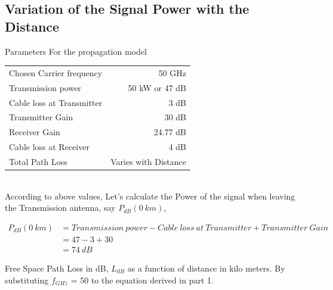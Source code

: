 \documentclass[a4paper,11pt]{article}%
\begin{document}
%
%

\pagebreak
\subsection{Variation of the Signal Power with the Distance}

Parameters For the propagation model\\

\begin{tabular}{l r}
Chosen Carrier frequency & 50 GHz\\
Transmission power & 50 kW or 47 dB\\
Cable loss at Transmitter & 3 dB\\
Transmitter Gain & 30 dB\\
Receiver Gain &24.77 dB\\
Cable loss at Receiver &4 dB\\
Total Path Loss & Varies with Distance\\
\end{tabular}\\[1cm]

According to above values, Let's calculate the Power of the signal when leaving the  Transmission antenna, say $P_{dB}(0~km)$,

\[
\begin{split}
P_{dB}(0~km) & = Transmission~power -  Cable~loss~at~Transmitter + Transmitter~Gain\\
&=47-3+30\\
&=74~dB
\end{split}
\]

Free Space Path Loss in dB, $L_{dB}$ as a function of distance in kilo meters. By substituting $f_{GHz}$ = 50 to the equation derived in part 1.
\end{document}
